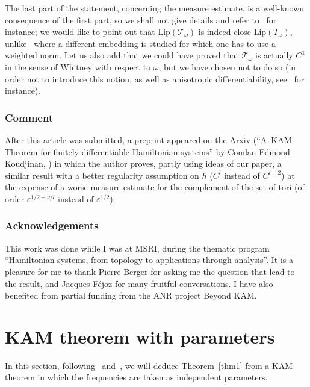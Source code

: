 The last part of the statement, concerning the measure estimate, is a well-known consequence of the first part, so we shall not give details and refer to~\cite{Pos01} for instance; we would like to point out that $\mathrm{Lip}(\mathcal{T}_\omega)$ is indeed close $\mathrm{Lip}(T_\omega)$, unlike~\cite{Pos01} where a different embedding is studied for which one has to use a weighted norm. Let us also add that we could have proved that $\mathcal{T}_\omega$ is actually $C^1$ in the sense of Whitney with respect to $\omega$, but we have chosen not to do so (in order not to introduce this notion, as well as anisotropic differentiability, see~\cite{Pos82} for instance).

\subsubsection*{Comment} After this article was submitted, a preprint appeared on the Arxiv (``A~KAM Theorem for finitely differentiable Hamiltonian systems'' by Comlan Edmond Koudjinan, ) in which the author proves, partly using ideas of our paper, a similar result with a better regularity assumption on $h$ ($C^l$ instead of $C^{l+2}$) at the expense of a worse measure estimate for the complement of the set of tori (of order $\varepsilon^{1/2-\nu/l}$ instead of $\varepsilon^{1/2}$).

\subsubsection*{Acknowledgements} This work was done while I was at MSRI, during the thematic program ``Hamiltonian systems, from topology to applications through analysis''. It is a pleasure for me to thank Pierre Berger for asking me the question that lead to the result, and Jacques Féjoz for many fruitful conversations. I have also benefited from partial funding from the ANR project Beyond KAM.

\section{KAM theorem with parameters}\label{s2}

In this section, following~\cite{Pos01} and~\cite{Pop04}, we will deduce Theorem~\ref{thm1} from a KAM theorem in which the frequencies are taken as independent parameters.

